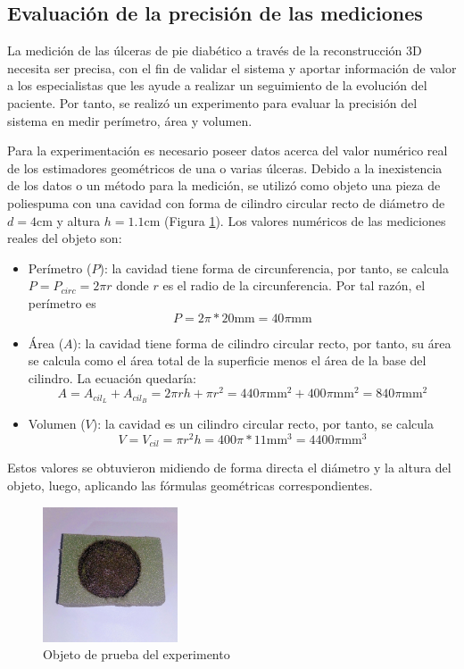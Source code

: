 \subsection{Evaluación de la precisión de las mediciones}\label{sec:expPrec}

La medición de las úlceras de pie diabético a través de la reconstrucción 3D necesita ser precisa, con el fin de validar el sistema y aportar información de valor a los especialistas que les ayude a realizar un seguimiento de la evolución del paciente. Por tanto, se realizó un experimento para evaluar la precisión del sistema en medir perímetro, área y volumen. 

Para la experimentación es necesario poseer datos acerca del valor numérico real de los estimadores geométricos de una o varias úlceras. Debido a la inexistencia de los datos o un método para la medición, se utilizó como objeto una pieza de poliespuma con una cavidad con forma de cilindro circular recto de diámetro de $d = 4$cm y altura $h = 1.1$cm (Figura \ref{fig:recObj}). Los valores numéricos de las mediciones reales del objeto son:

\begin{itemize}
	\item Perímetro ($P$): la cavidad tiene forma de circunferencia, por tanto, se calcula $P = P_{circ} = 2\pi r$ donde $r$ es el radio de la circunferencia. Por tal razón, el perímetro es $$P = 2\pi * 20\text{mm} = 40\pi\text{mm}$$
	\item Área ($A$): la cavidad tiene forma de cilindro circular recto, por tanto, su área se calcula como el área total de la superficie menos el área de la base del cilindro. La ecuación quedaría:
	$$A = A_{cil_{L}} + A_{cil_{B}} =  2\pi rh + \pi r^2 = 440 \pi \text{mm}^2 + 400\pi \text{mm}^2 = 840 \pi\text{mm}^2$$ 
	\item Volumen ($V$): la cavidad es un cilindro circular recto, por tanto, se calcula $$V = V_{cil} = \pi r^2 h = 400\pi 
	* 11 \text{mm}^3 = 4400\pi \text{mm}^3$$
\end{itemize}

Estos valores se obtuvieron midiendo de forma directa el diámetro y la altura del objeto, luego, aplicando las fórmulas geométricas correspondientes. 

\begin{figure}[ht]
	\centering
	\includegraphics[width=4cm]{./Graphics/reconstruction-object.jpg}
	\caption{Objeto de prueba del experimento}
	\label{fig:recObj}
\end{figure}

